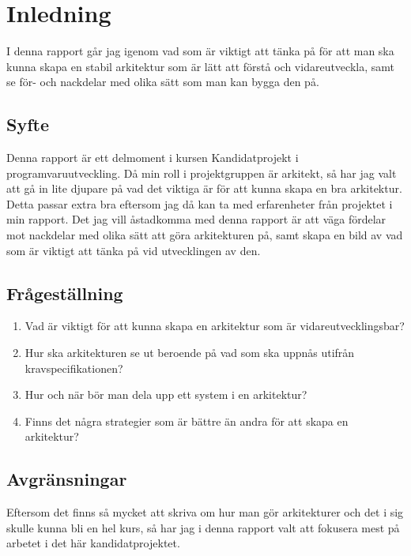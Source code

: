 \section{Inledning}
I denna rapport går jag igenom vad som är viktigt att tänka på för att man ska kunna skapa en stabil arkitektur som är lätt att förstå och vidareutveckla, samt se för- och nackdelar med olika sätt som man kan bygga den på.

\subsection{Syfte}
Denna rapport är ett delmoment i kursen Kandidatprojekt i programvaruutveckling. Då min roll i projektgruppen är arkitekt, så har jag valt att gå in lite djupare på vad det viktiga är för att kunna skapa en bra arkitektur. Detta passar extra bra eftersom jag då kan ta med erfarenheter från projektet i min rapport.
Det jag vill åstadkomma med denna rapport är att väga fördelar mot nackdelar med olika sätt att göra arkitekturen på, samt skapa en bild av vad som är viktigt att tänka på vid utvecklingen av den.

\subsection{Frågeställning}
\begin{enumerate}
	\item Vad är viktigt för att kunna skapa en arkitektur som är vidareutvecklingsbar?
	\item Hur ska arkitekturen se ut beroende på vad som ska uppnås utifrån kravspecifikationen?
	\item Hur och när bör man dela upp ett system i en arkitektur?
	\item Finns det några strategier som är bättre än andra för att skapa en arkitektur?
\end{enumerate}

\subsection{Avgränsningar}
Eftersom det finns så mycket att skriva om hur man gör arkitekturer och det i sig skulle kunna bli en hel kurs, så har jag i denna rapport valt att fokusera mest på arbetet i det här kandidatprojektet.



